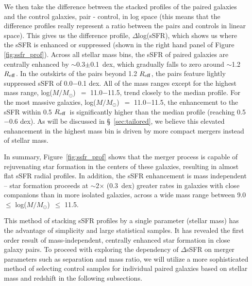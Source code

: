 \documentclass[iop,revtex4,twocolumn,apj,numberedappendix,appendixfloats]{emulateapj}
\newcommand{\reff}{$R_{\rm eff}$}
\newcommand{\logm}{log($M/M_{\odot}$)}
\begin{document}
We then take the difference between the stacked profiles of the paired galaxies and the control galaxies, pair - control, in log space (this means that the difference profiles really represent a ratio between the pairs and controls in linear space). This gives us the difference profile, $\Delta$log(sSFR), which shows us where the sSFR is enhanced or suppressed (shown in the right hand panel of Figure \ref{fig:ssfr_prof}). Across all stellar mass bins, the sSFR of paired galaxies are centrally enhanced by $\sim$0.3$\pm$0.1~dex, which gradually falls to zero around $\sim$1.2 \reff. In the outskirts of the pairs beyond 1.2 \reff, the pairs feature lightly suppressed sSFR of 0.0$-$0.1 dex. All of the mass ranges except for the highest mass range, \logm\ $=$ 11.0$-$11.5, trend closely to the median profile. For the most massive galaxies, \logm\ $=$ 11.0$-$11.5, the enhancement to the sSFR within 0.5 \reff\ is significantly higher than the median profile (reaching 0.5$-$0.6 dex). As will be discussed in \S~\ref{sec:tailored}, we believe this elevated enhancement in the highest mass bin is driven by more compact mergers instead of stellar mass. 

In summary, Figure~\ref{fig:ssfr_prof} shows that the merger process is capable of rejuvenating star formation in the centers of these galaxies, resulting in almost flat sSFR radial profiles. In addition, the sSFR enhancement is mass independent -- star formation proceeds at $\sim$2$\times$ (0.3~dex) greater rates in galaxies with close companions than in more isolated galaxies, across a wide mass range between 9.0 $\leq$ \logm\ $\leq$ 11.5.

This method of stacking sSFR profiles by a single parameter (stellar mass) has the advantage of simplicity and large statistical samples. It has revealed the first order result of mass-independent, centrally enhanced star formation in close galaxy pairs. To proceed with exploring the dependency of $\Delta$sSFR on merger parameters such as separation and mass ratio, we will utilize a more sophisticated method of selecting control samples for individual paired galaxies based on stellar mass and redshift in the following subsections.  
\end{document}
